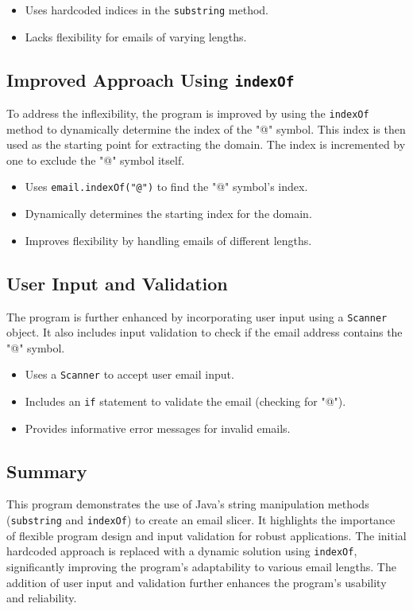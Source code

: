 \documentclass{article}
\begin{document}
\begin{itemize}
    \item Uses hardcoded indices in the \texttt{substring} method.
    \item Lacks flexibility for emails of varying lengths.
\end{itemize}

\subsection{Improved Approach Using \texttt{indexOf}}

To address the inflexibility, the program is improved by using the \texttt{indexOf} method to dynamically determine the index of the "@" symbol. This index is then used as the starting point for extracting the domain.  The index is incremented by one to exclude the "@" symbol itself.

\begin{itemize}
    \item Uses \texttt{email.indexOf("@")} to find the "@" symbol's index.
    \item Dynamically determines the starting index for the domain.
    \item Improves flexibility by handling emails of different lengths.
\end{itemize}

\subsection{User Input and Validation}

The program is further enhanced by incorporating user input using a \texttt{Scanner} object.  It also includes input validation to check if the email address contains the "@" symbol.

\begin{itemize}
    \item Uses a \texttt{Scanner} to accept user email input.
    \item Includes an \texttt{if} statement to validate the email (checking for "@").
    \item Provides informative error messages for invalid emails.
\end{itemize}

\subsection{Summary}

This program demonstrates the use of Java's string manipulation methods (\texttt{substring} and \texttt{indexOf}) to create an email slicer. It highlights the importance of flexible program design and input validation for robust applications.  The initial hardcoded approach is replaced with a dynamic solution using \texttt{indexOf}, significantly improving the program's adaptability to various email lengths.  The addition of user input and validation further enhances the program's usability and reliability.
\end{document}
